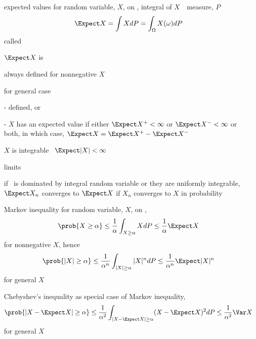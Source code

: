 \documentclass[17pt,landscape]{foils}
\newcommand{\algF}{\algk{F}}
\begin{document}
{\begin{mydefinition}{expected values}%
	for random variable, $X$, on \meas{\Omega}{\algF}{P},
	integral of $X$\ \wrt\ measure, $P$
	$$
		\Expect X
			=
		\int X dP
		 	=
		\int_\Omega X(\omega) dP
	$$
	called 
\end{mydefinition}

\vspace{-.2em}
\bit
\item
	$\Expect X$ is
	\bit
	\item
		always defined for nonnegative $X$
	\item
		for general case
		\bit
		\item [-]
			defined, or
		\item [-]
			$X$ has an expected value if either $\Expect X^+<\infty$ or $\Expect X^-<\infty$ or both,
			in which case, $\Expect X =\Expect X^+ - \Expect X^-$
		\eit
	\eit

\vitem
	$X$ is integrable \iaoi\ $\Expect |X| <\infty$

\vitem
	limits
	\bit
	\item
		if \ is dominated by integral random variable
			or
		they are uniformly integrable,
		$\Expect X_n$ converges to $\Expect X$
		if $X_n$ converges to $X$ in probability
	\eit

\eit



\begin{myinequality}{Markov inequality}%
	for random variable, $X$, on \meas{\Omega}{\algF}{P},
	$$
		\prob{X\geq \alpha} \leq \frac{1}{\alpha} \int_{X\geq \alpha} X d P \leq \frac{1}{\alpha} \Expect X
	$$
	for nonnegative $X$, hence
	$$
		\prob{|X|\geq \alpha} \leq \frac{1}{\alpha^n} \int_{|X|\geq \alpha} |X|^n d P \leq \frac{1}{\alpha^n} \Expect |X|^n
	$$
	for general $X$
\end{myinequality}

\begin{myinequality}{Chebyshev's inequality}%
	as special case of Markov inequality,
	$$
		\prob{|X-\Expect X|\geq \alpha}
			\leq
		\frac{1}{\alpha^2} \int_{|X-\Expect X|\geq \alpha} (X-\Expect X)^2 d P
			\leq
		\frac{1}{\alpha^2} \Var X
	$$
	for general $X$
\end{myinequality}


}
\end{document}
